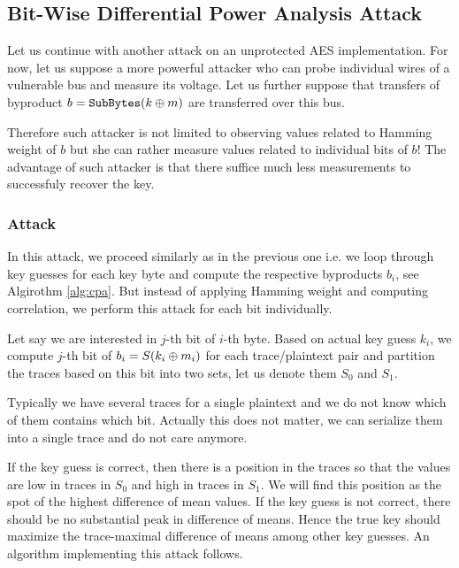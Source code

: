 
\subsection{Bit-Wise Differential Power Analysis Attack}

Let us continue with another attack on an unprotected AES implementation. For now, let us suppose a more powerful attacker who can probe individual wires of a vulnerable bus and measure its voltage. Let us further suppose that transfers of byproduct $b = \texttt{SubBytes}(k\oplus m)$ are transferred over this bus.

Therefore such attacker is not limited to observing values related to Hamming weight of $b$ but she can rather measure values related to individual bits of $b$! The advantage of such attacker is that there suffice much less measurements to successfuly recover the key.

\subsubsection{Attack}
	
	In this attack, we proceed similarly as in the previous one i.e. we loop through key guesses for each key byte and compute the respective byproducts $b_i$, see Algirothm \ref{alg:cpa}. But instead of applying Hamming weight and computing correlation, we perform this attack for each bit individually.
	
	Let say we are interested in $j$-th bit of $i$-th byte. Based on actual key guess $k_i$, we compute $j$-th bit of $b_i = S(k_i\oplus m_i)$ for each trace/plaintext pair and partition the traces based on this bit into two sets, let us denote them $S_0$ and $S_1$.
	
	\begin{note}
	\label{note:concattraces}
		Typically we have several traces for a single plaintext and we do not know which of them contains which bit. Actually this does not matter, we can serialize them into a single trace and do not care anymore.
	\end{note}
	
	If the key guess is correct, then there is a position in the traces so that the values are low in traces in $S_0$ and high in traces in $S_1$. We will find this position as the spot of the highest difference of mean values. If the key guess is not correct, there should be no substantial peak in difference of means. Hence the true key should maximize the trace-maximal difference of means among other key guesses. An algorithm implementing this attack follows.
	
